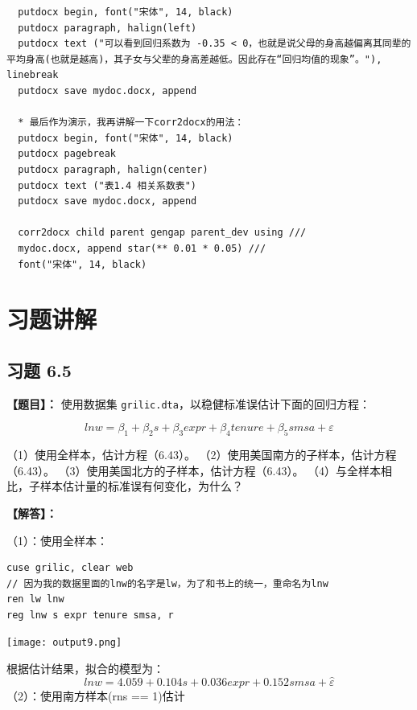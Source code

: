 \documentclass[cn,fancy,blue,11pt]{elegantbook}
\begin{document}
\begin{lstlisting}
  putdocx begin, font("宋体", 14, black)
  putdocx paragraph, halign(left)
  putdocx text ("可以看到回归系数为 -0.35 < 0，也就是说父母的身高越偏离其同辈的平均身高(也就是越高)，其子女与父辈的身高差越低。因此存在“回归均值的现象”。"), linebreak
  putdocx save mydoc.docx, append

  * 最后作为演示，我再讲解一下corr2docx的用法：
  putdocx begin, font("宋体", 14, black)
  putdocx pagebreak
  putdocx paragraph, halign(center)
  putdocx text ("表1.4 相关系数表")
  putdocx save mydoc.docx, append

  corr2docx child parent gengap parent_dev using ///
  mydoc.docx, append star(** 0.01 * 0.05) ///
  font("宋体", 14, black)
\end{lstlisting}

\hypertarget{section-43}{%
\chapter{习题讲解}\label{section-43}}

\hypertarget{section-44}{%
\section{习题 6.5}\label{section-44}}

\textbf{【题目】：}
使用数据集 \lstinline{grilic.dta}，以稳健标准误估计下面的回归方程：

\begin{equation}
  ln w = \beta_{1} + \beta_{2} s + \beta_{3} expr + \beta_{4} tenure + \beta_{5} smsa + \varepsilon
\end{equation}

（1）使用全样本，估计方程（6.43）。
（2）使用美国南方的子样本，估计方程（6.43）。
（3）使用美国北方的子样本，估计方程（6.43）。
（4）与全样本相比，子样本估计量的标准误有何变化，为什么？

\textbf{【解答】：}

（1）：使用全样本：

\begin{lstlisting}
cuse grilic, clear web
// 因为我的数据里面的lnw的名字是lw，为了和书上的统一，重命名为lnw
ren lw lnw
reg lnw s expr tenure smsa, r
\end{lstlisting}

\noindent\texttt{[image: output9.png]}

根据估计结果，拟合的模型为：
\begin{equation}
  lnw = 4.059 + 0.104s + 0.036expr + 0.152smsa +\hat{\varepsilon}
\end{equation}
（2）：使用南方样本(rns == 1)估计
\end{document}
